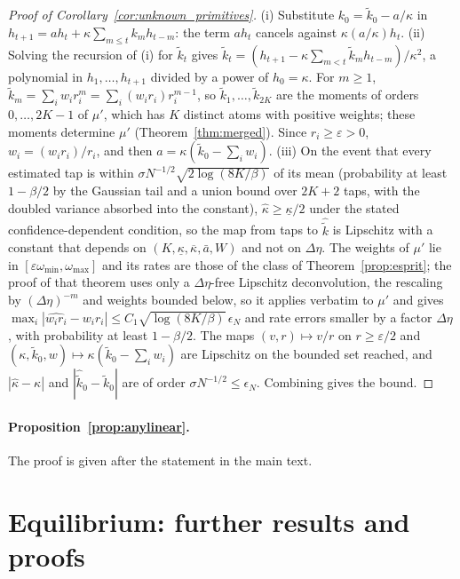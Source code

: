 \documentclass[12pt]{article}
\theoremstyle{definition}
\theoremstyle{remark}
\begin{document}
\begin{proof}[Proof of Corollary~\ref{cor:unknown_primitives}]
(i) Substitute $k_0=\tilde k_0-a/\kappa$ in $h_{t+1}=ah_t+\kappa\sum_{m\le t}k_mh_{t-m}$: the term $ah_t$ cancels against $\kappa(a/\kappa)h_t$. (ii) Solving the recursion of (i) for $\tilde k_t$ gives $\tilde k_t=(h_{t+1}-\kappa\sum_{m<t}\tilde k_mh_{t-m})/\kappa^2$, a polynomial in $h_1,\ldots,h_{t+1}$ divided by a power of $h_0=\kappa$. For $m\ge1$, $\tilde k_m=\sum_iw_ir_i^m=\sum_i(w_ir_i)r_i^{m-1}$, so $\tilde k_1,\ldots,\tilde k_{2K}$ are the moments of orders $0,\ldots,2K-1$ of $\mu'$, which has $K$ distinct atoms with positive weights; these moments determine $\mu'$ (Theorem~\ref{thm:merged}). Since $r_i\ge\varepsilon>0$, $w_i=(w_ir_i)/r_i$, and then $a=\kappa(\tilde k_0-\sum_iw_i)$. (iii) On the event that every estimated tap is within $\sigma N^{-1/2}\sqrt{2\log(8K/\beta)}$ of its mean (probability at least $1-\beta/2$ by the Gaussian tail and a union bound over $2K+2$ taps, with the doubled variance absorbed into the constant), $\hat\kappa\ge\underline\kappa/2$ under the stated confidence-dependent condition, so the map from taps to $\hat{\tilde k}$ is Lipschitz with a constant that depends on $(K,\underline\kappa,\overline\kappa,\bar a,W)$ and not on $\Delta\eta$. The weights of $\mu'$ lie in $[\varepsilon\omega_{\min},\omega_{\max}]$ and its rates are those of the class of Theorem~\ref{prop:esprit}; the proof of that theorem uses only a $\Delta\eta$-free Lipschitz deconvolution, the rescaling by $(\Delta\eta)^{-m}$ and weights bounded below, so it applies verbatim to $\mu'$ and gives $\max_i|\widehat{w_ir_i}-w_ir_i|\le C_1\sqrt{\log(8K/\beta)}\,\epsilon_N$ and rate errors smaller by a factor $\Delta\eta$, with probability at least $1-\beta/2$. The maps $(v,r)\mapsto v/r$ on $r\ge\varepsilon/2$ and $(\kappa,\tilde k_0,w)\mapsto\kappa(\tilde k_0-\sum_iw_i)$ are Lipschitz on the bounded set reached, and $|\hat\kappa-\kappa|$ and $|\hat{\tilde k}_0-\tilde k_0|$ are of order $\sigma N^{-1/2}\le\epsilon_N$. Combining gives the bound.
\end{proof}
\paragraph{Proposition~\ref{prop:anylinear}.} The proof is given after the statement in the main text.

\section{Equilibrium: further results and proofs}\label{app:eqinv}
\end{document}
